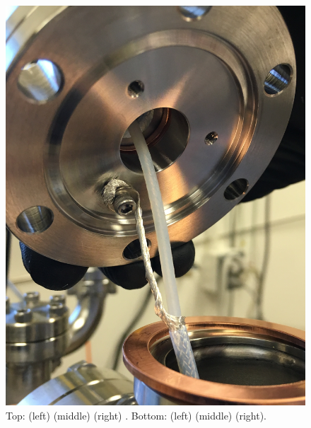 \begin{figure}[htbp]
\begin{minipage}{0.33\textwidth}
    \includegraphics[width=\linewidth]{figures/testbed/ft6_3.jpg}
    \end{minipage}
    
    
\caption{Top: (left) (middle) (right) . Bottom: (left) (middle) (right).}
 \label{fig:cableft}
\end{figure}




